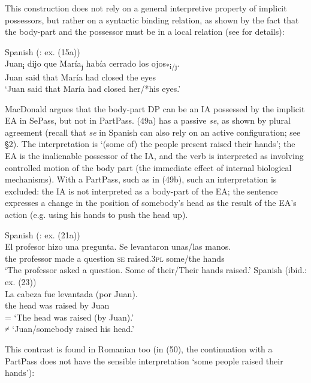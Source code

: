 \documentclass[output=paper]{langsci/langscibook}
\begin{document}
This construction does not rely on a general interpretive property of implicit possessors, but rather on a syntactic binding relation, as shown by the fact that the body-part and the possessor must be in a local relation (see \citealt{MacDonald2017} for details):

\ea%
    Spanish (\citealt{MacDonald2017}: ex. (15a))\label{ex:giurgea:48}\\
    \gll Juan\textsubscript{i} dijo que María\textsubscript{j} había cerrado los ojos\textsubscript{*i/j}.   \\
         Juan said that María  had    closed   the eyes      \\
    \glt ‘Juan said that María had closed her/*his eyes.’ 
    \z

MacDonald argues that the body-part DP can be an IA possessed by the implicit EA in SePass, but not in PartPass. (49a) has a passive \textit{se}, as shown by plural agreement (recall that \textit{se} in Spanish can also rely on an active configuration; see §2). The interpretation is ‘(some of) the people present raised their hands’; the EA is the inalienable possessor of the IA, and the verb is interpreted as involving controlled motion of the body part (the immediate effect of internal biological mechanisms). With a PartPass, such as in (49b), such an interpretation is excluded: the IA is not interpreted as a body-part of the EA; the sentence expresses a change in the position of somebody’s head as the result of the EA’s action (e.g. using his hands to push the head up).   

\ea%
    \label{ex:giurgea:49}
    \ea Spanish (\citealt{MacDonald2017}: ex. (21a))\\
    \gll El   profesor   hizo   una pregunta. Se  levantaron unas/las   manos. \\
         the professor  made a      question  \textsc{se}  raised.\textsc{3pl}  some/the hands         \\
    \glt ‘The professor asked a question. Some of their/Their hands raised.’
    \ex   Spanish (ibid.: ex. (23))\\
    \gll La cabeza fue levantada (por Juan).    \\
         the head   was raised        by  Juan\\
    \glt = ‘The head was raised (by Juan).’\\
         ≠ ‘Juan/somebody raised his head.’
\z
\z

This contrast is found in Romanian too (in (50), the continuation with a PartPass does not have the sensible interpretation ‘some people raised their hands’):
\end{document}
